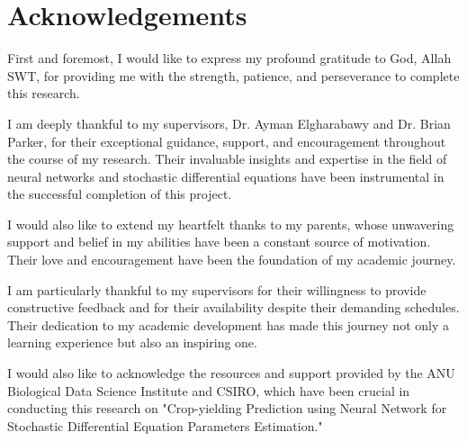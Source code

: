 \chapter*{Acknowledgements}

First and foremost, I would like to express my profound gratitude to God, Allah SWT, for providing me with the strength, patience, and perseverance to complete this research.

I am deeply thankful to my supervisors, Dr. Ayman Elgharabawy and Dr. Brian Parker, for their exceptional guidance, support, and encouragement throughout the course of my research. Their invaluable insights and expertise in the field of neural networks and stochastic differential equations have been instrumental in the successful completion of this project.

I would also like to extend my heartfelt thanks to my parents, whose unwavering support and belief in my abilities have been a constant source of motivation. Their love and encouragement have been the foundation of my academic journey.

I am particularly thankful to my supervisors for their willingness to provide constructive feedback and for their availability despite their demanding schedules. Their dedication to my academic development has made this journey not only a learning experience but also an inspiring one.

I would also like to acknowledge the resources and support provided by the ANU Biological Data Science Institute and CSIRO, which have been crucial in conducting this research on "Crop-yielding Prediction using Neural Network for Stochastic Differential Equation Parameters Estimation."